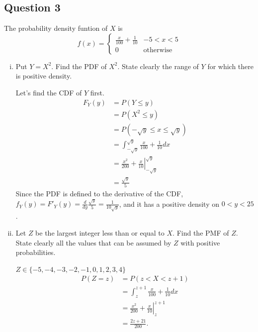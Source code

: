 \documentclass{article}
\begin{document}
\subsection*{Question 3}
The probability density funtion of $X$ is
\[ f(x)=\begin{cases} 
      \frac{x}{100}+\frac{1}{10} & -5<x<5 \\
      0 & \text{otherwise}
   \end{cases}
\]
\begin{enumerate}[i)]
    \item Put $Y=X^2$. Find the PDF of $X^2$. State clearly the range of $Y$ for which there is positive density.
    
    Let's find the CDF of $Y$ first. 
    \begin{align*}
        F_Y(y) &= P(Y \leq y)  \\
        &= P(X^2 \leq y) \\
        &= P(-\sqrt{y} \leq x \leq \sqrt{y}) \\
        &= \int_{-\sqrt{y}}^{\sqrt{y}} \frac{x}{100} + \frac{1}{10} dx \\
        &= \left.\frac{x^2}{200} + \frac{x}{10} \right \vert ^{\sqrt{y}}_{-\sqrt{y}} \\
        &=\frac{\sqrt{y}}{5}
        \end{align*}
    Since the PDF is defined to the derivative of the CDF, $f_Y(y) = F'_Y(y) = \frac{d}{dy} \frac{\sqrt{y}}{5} = \frac{1}{10\sqrt{y}}$, and it has a positive density on $0 < y < 25$.

    \item Let $Z$ be the largest integer less than or equal to $X$. Find the PMF of $Z$. State clearly all the values that can be assumed by $Z$ with positive probabilities. 
    
    $Z \in \{-5, -4, -3, -2, -1, 0,1,2,3,4\}$
    \begin{align*}
        P(Z=z)&= P(z < X < z+1) \\
        &= \int_z^{z+1} \frac{x}{100} + \frac{1}{10} dx \\
        &= \left. \frac{x^2}{200} + \frac{x}{10} \right \vert^{z+1}_z \\
        &= \frac{2z+21}{200}.
    \end{align*}
\end{enumerate}
\end{document}

